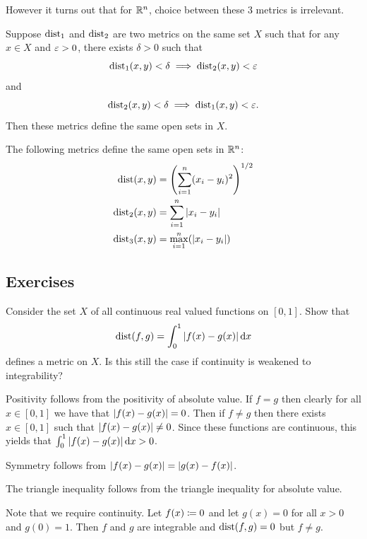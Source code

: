 \documentclass[letterpaper, 11pt, oneside]{book}
\begin{document}
However it turns out that for $\mathbb{R}^{n}$, choice between these 3 metrics is irrelevant.

\begin{prop}
  Suppose $\operatorname{dist}_{1}$ and $\operatorname{dist}_{2}$ are two metrics on the same set $X$ such that for any $x \in X$ and $\varepsilon > 0$, there exists $\delta > 0$ such that
  \[
    \operatorname{dist}_{1}(x, y) < \delta \implies \operatorname{dist}_{2}(x, y) < \varepsilon
  \]
  and
  \[
    \operatorname{dist}_{2}(x, y) < \delta \implies \operatorname{dist}_{1}(x, y) < \varepsilon.
  \]
  Then these metrics define the same open sets in $X$.
\end{prop}

\begin{pf}
\end{pf}

\begin{cor}
  The following metrics define the same open sets in $\mathbb{R}^{n}$:
  \begin{align*}
    \dist(x, y) &= \pqty{\sum_{i = 1}^{n} (x_{i} - y_{i})^{2}}^{1/2} \\
    \dist_{2}(x, y) &= \sum_{i = 1}^{n} \abs{x_{i} - y_{i}} \\
    \dist_{3}(x, y) &= \max_{i = 1}^{n} (\abs{x_{i} - y_{i}})
  \end{align*}
\end{cor}

\clearpage

\subsection*{Exercises}

\begin{exercise}
  Consider the set $X$ of all continuous real valued functions on $[0, 1]$.
  Show that
  \[
    \operatorname{dist}(f, g) = \int_{0}^{1} \abs{f(x) - g(x)} \dd{x}
  \]
  defines a metric on $X$.
  Is this still the case if continuity is weakened to integrability?
\end{exercise}
\begin{pf}
  Positivity follows from the positivity of absolute value.
  If $f = g$ then clearly for all $x \in [0, 1]$ we have that $\abs{f(x) - g(x)} = 0$.
  Then if $f \neq g$ then there exists $x \in [0, 1]$ such that $\abs{f(x) - g(x)} \neq 0$.
  Since these functions are continuous, this yields that $\int_{0}^{1} \abs{f(x) - g(x)} \dd{x} > 0$.

  Symmetry follows from $\abs{f(x) - g(x)} = \abs{g(x) - f(x)}$.

  The triangle inequality follows from the triangle inequality for absolute value.

  Note that we require continuity.
  Let $f(x) \coloneqq 0$ and let $g(x) = 0$ for all $x > 0$ and $g(0) = 1$.
  Then $f$ and $g$ are integrable and $\operatorname{dist}(f, g) = 0$ but $f \neq g$.
\end{pf}
\end{document}

